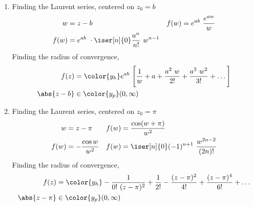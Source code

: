 \begin{enumerate}
    \item Finding the Laurent series, centered on $ z_0 = b $
          \begin{align}
              w    & = z - b                     &
              f(w) & = e^{ab}\ \frac{e^{aw}}{w}    \\
              f(w) & = e^{ab}\ \cdot \iser[n]{0}
              \frac{a^n}{n!}\ w^{n-1}
          \end{align}
          Finding the radius of convergence,
          \begin{align}
              f(z)        & = \color{y_h} e^{ab}\ \Bigg[ \frac{1}{w} + a
              + \frac{a^2\ w}{2!} + \frac{a^3\ w^2}{3!} + \dots \Bigg]   \\
              \abs{z - b} & \in \color{y_p} (0, \infty)
          \end{align}

    \item Finding the Laurent series, centered on $ z_0 = \pi $
          \begin{align}
              w    & = z - \pi                                        &
              f(w) & = \frac{\cos(w + \pi)}{w^2}                        \\
              f(w) & = -\frac{\cos w}{w^2}                            &
              f(w) & = \iser[n]{0} (-1)^{n+1}\ \frac{w^{2n-2}}{(2n)!}
          \end{align}
          Finding the radius of convergence,
          \begin{align}
              f(z)          & = \color{y_h} -\frac{1}{0!\ (z-\pi)^2} + \frac{1}{2!}
              - \frac{(z-\pi)^2}{4!} + \frac{(z-\pi)^4}{6!} + \dots                 \\
              \abs{z - \pi} & \in \color{y_p} (0, \infty)
          \end{align}


\end{enumerate}
